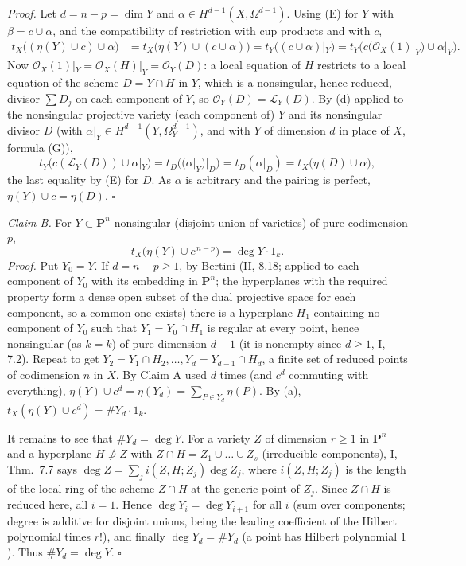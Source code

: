 \documentclass[11pt]{article}
\begin{document}
\emph{Proof.} Let $d=n-p=\dim Y$ and $\alpha\in H^{d-1}(X,\Omega^{d-1})$. Using (E) for $Y$ with $\beta=c\cup\alpha$, and the compatibility of restriction with cup products and with $c$,
\begin{align*}
t_X\big((\eta(Y)\cup c)\cup\alpha\big)&=t_X\big(\eta(Y)\cup(c\cup\alpha)\big)=t_Y\big((c\cup\alpha)|_Y\big)=t_Y\big(c(\mathcal O_X(1)|_Y)\cup\alpha|_Y\big).
\end{align*}
Now $\mathcal O_X(1)|_Y=\mathcal O_X(H)|_Y=\mathcal O_Y(D)$: a local equation of $H$ restricts to a local equation of the scheme $D=Y\cap H$ in $Y$, which is a nonsingular, hence reduced, divisor $\sum D_j$ on each component of $Y$, so $\mathcal O_Y(D)=\mathcal L_Y(D)$. By (d) applied to the nonsingular projective variety (each component of) $Y$ and its nonsingular divisor $D$ (with $\alpha|_Y\in H^{d-1}(Y,\Omega^{d-1}_Y)$, and with $Y$ of dimension $d$ in place of $X$, formula (G)),
\[
t_Y\big(c(\mathcal L_Y(D))\cup\alpha|_Y\big)=t_D\big((\alpha|_Y)|_D\big)=t_D(\alpha|_D)=t_X\big(\eta(D)\cup\alpha\big),
\]
the last equality by (E) for $D$. As $\alpha$ is arbitrary and the pairing is perfect, $\eta(Y)\cup c=\eta(D)$. $\square$

\emph{Claim B.} For $Y\subset\mathbf P^n$ nonsingular (disjoint union of varieties) of pure codimension $p$,
\[
t_X\big(\eta(Y)\cup c^{\,n-p}\big)=\deg Y\cdot 1_k .
\]
\emph{Proof.} Put $Y_0=Y$. If $d=n-p\ge1$, by Bertini (II, 8.18; applied to each component of $Y_0$ with its embedding in $\mathbf P^n$; the hyperplanes with the required property form a dense open subset of the dual projective space for each component, so a common one exists) there is a hyperplane $H_1$ containing no component of $Y_0$ such that $Y_1=Y_0\cap H_1$ is regular at every point, hence nonsingular (as $k=\bar k$) of pure dimension $d-1$ (it is nonempty since $d\ge1$, I, 7.2). Repeat to get $Y_2=Y_1\cap H_2,\dots,Y_d=Y_{d-1}\cap H_d$, a finite set of reduced points of codimension $n$ in $X$. By Claim A used $d$ times (and $c^{d}$ commuting with everything), $\eta(Y)\cup c^d=\eta(Y_d)=\sum_{P\in Y_d}\eta(P)$. By (a), $t_X(\eta(Y)\cup c^d)=\#Y_d\cdot1_k$.

It remains to see that $\#Y_d=\deg Y$. For a variety $Z$ of dimension $r\ge1$ in $\mathbf P^n$ and a hyperplane $H\not\supseteq Z$ with $Z\cap H=Z_1\cup\dots\cup Z_s$ (irreducible components), I, Thm.~7.7 says $\deg Z=\sum_j i(Z,H;Z_j)\deg Z_j$, where $i(Z,H;Z_j)$ is the length of the local ring of the scheme $Z\cap H$ at the generic point of $Z_j$. Since $Z\cap H$ is reduced here, all $i=1$. Hence $\deg Y_{i}=\deg Y_{i+1}$ for all $i$ (sum over components; degree is additive for disjoint unions, being the leading coefficient of the Hilbert polynomial times $r!$), and finally $\deg Y_d=\#Y_d$ (a point has Hilbert polynomial $1$). Thus $\#Y_d=\deg Y$. $\square$
\end{document}
